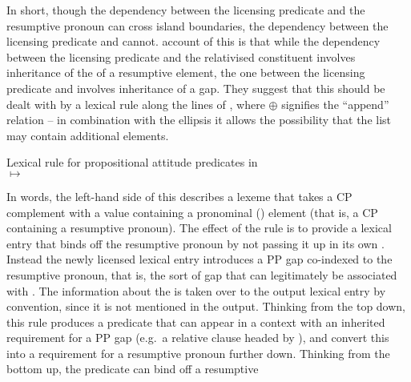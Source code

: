 \documentclass[output=paper
 	        ,biblatex
                ,babelshorthands
                ,newtxmath
                ,draftmode
                ,colorlinks, citecolor=brown
]{langscibook}
\begin{document}
In short, though the dependency between the licensing predicate and the resumptive pronoun
can cross island boundaries, the dependency between the licensing predicate and 
cannot.  account of this is that while the dependency between the
licensing predicate and the relativised constituent
involves inheritance of the \localv of a resumptive element, the one between the licensing predicate
and  involves inheritance of a gap. They suggest that this should be dealt with by a
lexical rule along the lines of , where $\oplus$ signifies the ``append'' relation --
in combination with the ellipsis it allows the possibility that the \comps list may contain
additional elements.
\begin{exe}\ex\label{x:rc-79}  Lexical rule for propositional attitude predicates in \\
$\mapsto$\\
\flushright
{}
\end{exe}%
In words, the left-hand side of this describes a lexeme that takes a CP complement with a
 value containing a pronominal () element (that is, a CP
containing a resumptive pronoun). The effect of the rule is to provide a lexical entry that 
binds off the resumptive pronoun by not passing it up in its own \slashv. Instead the newly licensed
lexical entry introduces a PP gap co-indexed to the resumptive pronoun, that is, the sort of gap that can legitimately be associated with
. The information about the \compsl is taken over to the output lexical entry by
convention, since it is not mentioned in the output.
Thinking from the top down, this rule produces a predicate that can appear in
a context with an inherited requirement for a PP gap (e.g.\ a relative clause
headed by ), and convert this into a requirement for a resumptive pronoun
further down. Thinking from the bottom up, the predicate can bind off a resumptive
\end{document}
